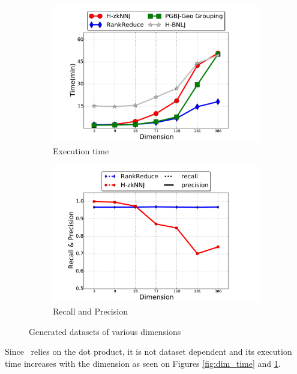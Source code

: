 \begin{figure}[ht]
	\centering
	\begin{subfigure}[b]{0.5\textwidth}
		\includegraphics[width=1\textwidth]{img-perf/dim/randtime.pdf} 
		\caption{Execution time%
		}
		\label{fig:rand_time}
	\end{subfigure}\begin{subfigure}[b]{0.5\textwidth}
	
	\includegraphics[width=1\textwidth]{img-perf/dim/randacc.pdf} 
	\caption{Recall and Precision}
	\label{fig:rand_acc}
\end{subfigure}%
\caption{Generated datasets of various dimensions}
\label{fig:dim_rand}
\end{figure} 


Since \HBNLJ~relies on the dot product, it is not dataset dependent and its execution time increases
with the dimension as seen on Figures \ref{fig:dim_time} and \ref{fig:rand_time}. 

